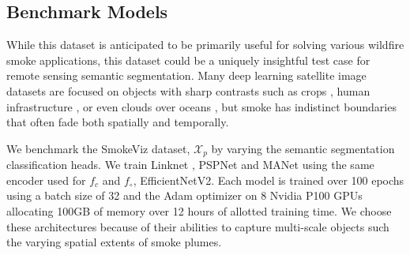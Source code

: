 \subsection{Benchmark Models}

While this dataset is anticipated to be primarily useful for solving various wildfire smoke applications, this dataset could be a uniquely insightful test case for remote sensing semantic segmentation. Many deep learning satellite image datasets are focused on objects with sharp contrasts such as crops \cite{crops}, human infrastructure \cite{polyworld}, or even clouds over oceans \cite{cyclone, cloud_texture}, but smoke has indistinct boundaries that often fade both spatially and temporally.

We benchmark the SmokeViz dataset, \(\mathcal{X}_{p}\) by varying the semantic segmentation classification heads. We train Linknet \cite{linknet}, PSPNet \cite{pspnet} and MANet \cite{manet} using the same encoder used for \(f_c\) and \(f_{\circ}\), EfficientNetV2. Each model is trained over 100 epochs using a batch size of 32 and the Adam optimizer on 8 Nvidia P100 GPUs allocating 100GB of memory over 12 hours of allotted training time. We choose these architectures because of their abilities to capture multi-scale objects such the varying spatial extents of smoke plumes.



